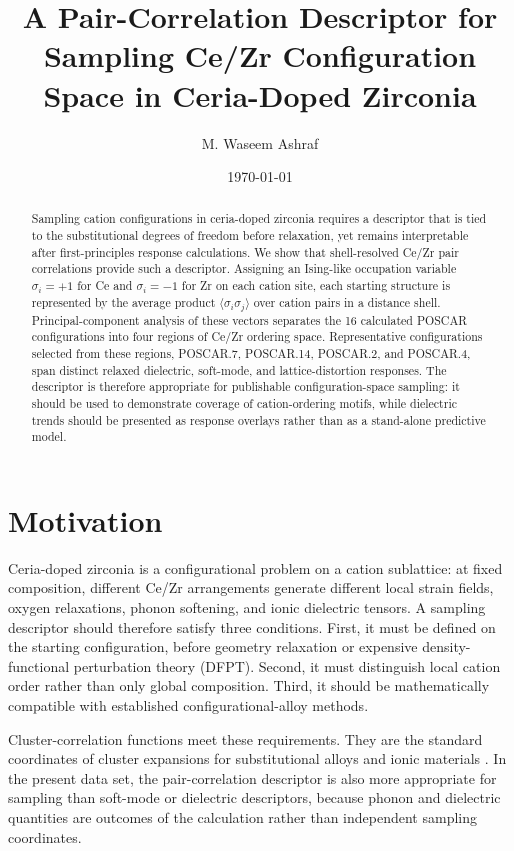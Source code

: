 \documentclass[11pt]{article}
\title{\vspace{-1.0cm}A Pair-Correlation Descriptor for Sampling Ce/Zr Configuration Space in Ceria-Doped Zirconia}
\author{M. Waseem Ashraf}
\date{\today}
\begin{document}
\maketitle

\begin{abstract}
Sampling cation configurations in ceria-doped zirconia requires a descriptor that is tied to the substitutional degrees of freedom before relaxation, yet remains interpretable after first-principles response calculations.  We show that shell-resolved Ce/Zr pair correlations provide such a descriptor.  Assigning an Ising-like occupation variable $\sigma_i=+1$ for Ce and $\sigma_i=-1$ for Zr on each cation site, each starting structure is represented by the average product $\langle\sigma_i\sigma_j\rangle$ over cation pairs in a distance shell.  Principal-component analysis of these vectors separates the 16 calculated POSCAR configurations into four regions of Ce/Zr ordering space.  Representative configurations selected from these regions, POSCAR.7, POSCAR.14, POSCAR.2, and POSCAR.4, span distinct relaxed dielectric, soft-mode, and lattice-distortion responses.  The descriptor is therefore appropriate for publishable configuration-space sampling: it should be used to demonstrate coverage of cation-ordering motifs, while dielectric trends should be presented as response overlays rather than as a stand-alone predictive model.
\end{abstract}

\section*{Motivation}
Ceria-doped zirconia is a configurational problem on a cation sublattice: at fixed composition, different Ce/Zr arrangements generate different local strain fields, oxygen relaxations, phonon softening, and ionic dielectric tensors.  A sampling descriptor should therefore satisfy three conditions.  First, it must be defined on the starting configuration, before geometry relaxation or expensive density-functional perturbation theory (DFPT).  Second, it must distinguish local cation order rather than only global composition.  Third, it should be mathematically compatible with established configurational-alloy methods.

Cluster-correlation functions meet these requirements.  They are the standard coordinates of cluster expansions for substitutional alloys and ionic materials \cite{sanchez2017,zhang2016,barroso2024,barroso2022}.  In the present data set, the pair-correlation descriptor is also more appropriate for sampling than soft-mode or dielectric descriptors, because phonon and dielectric quantities are outcomes of the calculation rather than independent sampling coordinates.
\end{document}
